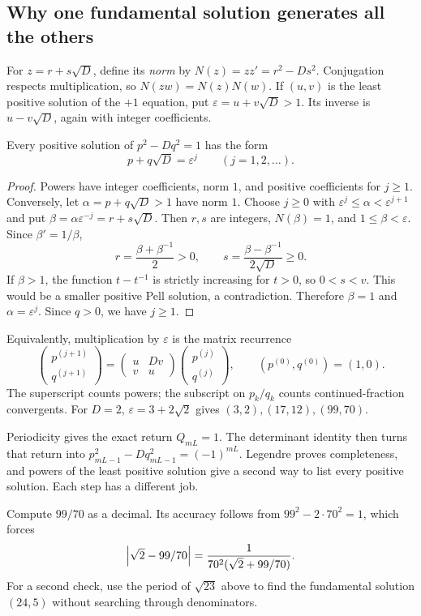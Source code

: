 \subsection*{Why one fundamental solution generates all the others}
For $z=r+s\sqrt D$, define its \emph{norm} by
$N(z)=zz'=r^2-Ds^2$. Conjugation respects multiplication, so
$N(zw)=N(z)N(w)$. If $(u,v)$ is the least positive solution of the $+1$
equation, put $\varepsilon=u+v\sqrt D>1$. Its inverse is
$u-v\sqrt D$, again with integer coefficients.

\begin{proposition}
\label{prop:pell-powers}
Every positive solution of $p^2-Dq^2=1$ has the form
\[
 p+q\sqrt D=\varepsilon^j\qquad(j=1,2,\ldots).
\]
\end{proposition}
\begin{proof}
Powers have integer coefficients, norm $1$, and positive coefficients
for $j\ge1$. Conversely, let $\alpha=p+q\sqrt D>1$ have norm $1$.
Choose $j\ge0$ with $\varepsilon^j\le\alpha<\varepsilon^{j+1}$ and put
$\beta=\alpha\varepsilon^{-j}=r+s\sqrt D$. Then $r,s$ are integers,
$N(\beta)=1$, and $1\le\beta<\varepsilon$. Since $\beta'=1/\beta$,
\[
 r=\frac{\beta+\beta^{-1}}2>0,
 \qquad s=\frac{\beta-\beta^{-1}}{2\sqrt D}\ge0.
\]
If $\beta>1$, the function $t-t^{-1}$ is strictly increasing for $t>0$,
so $0<s<v$. This would be a smaller positive Pell solution, a
contradiction. Therefore $\beta=1$ and $\alpha=\varepsilon^j$.
Since $q>0$, we have $j\ge1$.
\end{proof}

Equivalently, multiplication by $\varepsilon$ is the matrix recurrence
\[
 \begin{pmatrix}p^{(j+1)}\\q^{(j+1)}\end{pmatrix}
 =\begin{pmatrix}u&Dv\\v&u\end{pmatrix}
  \begin{pmatrix}p^{(j)}\\q^{(j)}\end{pmatrix},
 \qquad (p^{(0)},q^{(0)})=(1,0).
\]
The superscript counts powers; the subscript on $p_k/q_k$ counts
continued-fraction convergents. For $D=2$, $\varepsilon=3+2\sqrt2$ gives
$(3,2),(17,12),(99,70)$.

\begin{bigidea}
Periodicity gives the exact return $Q_{mL}=1$. The determinant identity
then turns that return into $p_{mL-1}^2-Dq_{mL-1}^2=(-1)^{mL}$.
Legendre proves completeness, and powers of the least positive solution
give a second way to list every positive solution. Each step has a
different job.
\end{bigidea}

\begin{checkpoint}
Compute $99/70$ as a decimal. Its accuracy follows from
$99^2-2\cdot70^2=1$, which forces
\[
 \left|\sqrt2-99/70\right|=\frac1{70^2(\sqrt2+99/70)}.
\]
For a second check, use the period of $\sqrt{23}$ above to find the
fundamental solution $(24,5)$ without searching through denominators.
\end{checkpoint}
